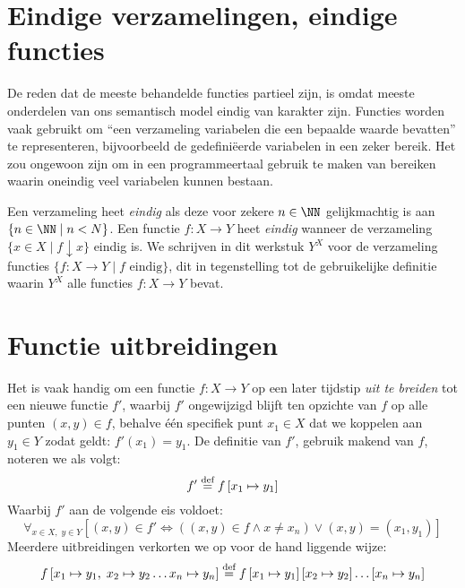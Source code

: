 \section{Eindige verzamelingen, eindige functies}
\label{sec:eindigefuncties}

De reden dat de meeste behandelde functies partieel zijn, is omdat meeste onderdelen van ons semantisch model eindig van karakter zijn. Functies worden vaak gebruikt om “een verzameling variabelen die een bepaalde waarde bevatten” te representeren, bijvoorbeeld de gedefiniëerde variabelen in een zeker bereik. Het zou ongewoon zijn om in een programmeertaal gebruik te maken van bereiken waarin oneindig veel variabelen kunnen bestaan.

Een verzameling heet \emph{eindig} als deze voor zekere $n \in \NN$ gelijkmachtig is aan $\{n \in \NN \mid n < N\}$.
Een functie $f: X \to Y$ heet \emph{eindig} wanneer de verzameling $\{x \in X \mid f \downarrow x\}$ eindig is.
We schrijven in dit werkstuk $Y^X$ voor de verzameling functies $\{f : X \to Y \mid f \text{ eindig} \}$, dit in tegenstelling tot de gebruikelijke definitie waarin $Y^X$ alle functies $f : X \to Y$ bevat.

\section{Functie uitbreidingen}
\label{sec:uitbreiden}

Het is vaak handig om een functie $f : X \to Y$ op een later tijdstip \emph{uit te breiden} tot een nieuwe functie $f'$, waarbij $f'$ ongewijzigd blijft ten opzichte van $f$ op alle punten $(x, y) \in f$, behalve één specifiek punt $x_1 \in X$ dat we koppelen aan $y_1 \in Y$ zodat geldt: $f'(x_1) = y_1$. De definitie van $f'$, gebruik makend van $f$, noteren we als volgt:
%
\begin{equation*}
  f' \DEF f \left[ x_1 \mapsto y_1 \right]
\end{equation*}
%
Waarbij $f'$ aan de volgende eis voldoet:
%
\begin{equation*}
  \forall_{x \in X,\; y \in Y} \left[ (x, y) \in f' \Leftrightarrow \left( (x, y) \in f \land x \neq x_n \right) \lor (x, y) = (x_1, y_1) \right]
\end{equation*}
%
Meerdere uitbreidingen verkorten we op voor de hand liggende wijze:
%
\begin{equation*}
  f \left[ x_1 \mapsto y_1,\; x_2 \mapsto y_2 \dots x_n \mapsto y_n \right]
  \DEF
  f \left[ x_1 \mapsto y_1 \right]
    \left[ x_2 \mapsto y_2 \right]\dots
    \left[ x_n \mapsto y_n \right]
\end{equation*}

